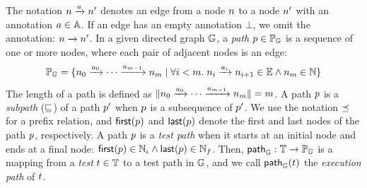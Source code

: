 The notation $n \xrightarrow{a} n'$ denotes an edge from a node $n$ to
a node $n'$ with an annotation $a \in \mathbb{A}$.
%
If an edge has an empty annotation $\bot$, we omit the annotation: $n
\xrightarrow{} n'$.
%
In a given directed graph $\mathbb{G}$, a \textit{path} $p \in \mathbb{P}_{\mathbb{G}}$
is a sequence of one or more nodes, where each pair of adjacent nodes is an
edge:
\begin{equation}\label{euq:path-def}
  \mathbb{P}_{\mathbb{G}} = \{
    n_0 \xrightarrow{a_0} \cdots \xrightarrow{a_{m-1}} n_m \mid
    \forall i < m. \; n_i \xrightarrow{a_i} n_{i+1} \in \mathbb{E} \wedge
    n_m \in \mathbb{N}
  \}
\end{equation}
%
The length of a path is defined as $\lVert{n_0 \xrightarrow{a_0} \cdots
\xrightarrow{a_{m-1}} n_m}\rVert = m$.
%
A path $p$ is a \textit{subpath} ($\sqsubseteq$) of a path $p'$ when $p$
is a subsequence of $p'$.
%
We use the notation $\preceq$ for a prefix relation, and $\textsf{first}(p)$ and
$\textsf{last}(p)$ denote the first and last nodes of the path $p$,
respectively.
%
A path $p$ is a \textit{test path} when it starts at an initial node and ends
at a final node: $\textsf{first}(p) \in \mathbb{N}_\iota \wedge \textsf{last}(p) \in
\mathbb{N}_f$.
%
Then, $\textsf{path}_{\mathbb{G}} : \mathbb{T} \rightarrow \mathbb{P}_{\mathbb{G}}$ is a mapping from
a \textit{test} $t \in \mathbb{T}$ to a test path in $\mathbb{G}$, and we call
$\textsf{path}_{\mathbb{G}}(t)$ the \textit{execution path} of $t$.


